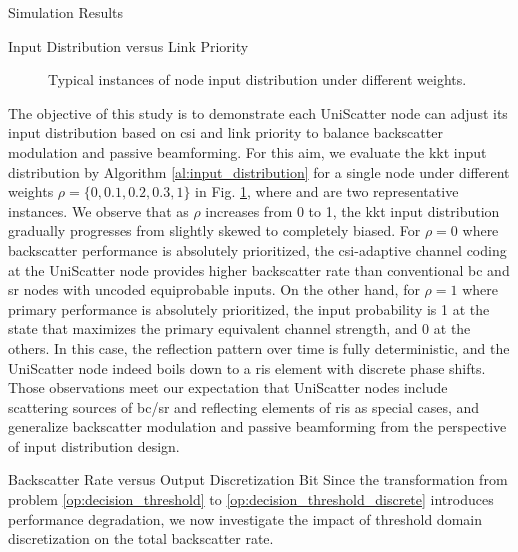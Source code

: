 \documentclass[journal]{IEEEtran}
\begin{document}
\begin{section}{Simulation Results}
	\begin{subsection}{Input Distribution versus Link Priority}
		\begin{figure}[!t]
			\centering
			\caption{Typical instances of node input distribution under different weights.}
			\label{fi:distribution_weights}
		\end{figure}
		The objective of this study is to demonstrate each UniScatter node can adjust its input distribution based on \gls{csi} and link priority to balance backscatter modulation and passive beamforming.
		For this aim, we evaluate the \gls{kkt} input distribution by Algorithm \ref{al:input_distribution} for a single node under different weights $\rho=\{0,0.1,0.2,0.3,1\}$ in Fig. \ref{fi:distribution_weights}, where  and  are two representative instances.
		We observe that as $\rho$ increases from \num{0} to \num{1}, the \gls{kkt} input distribution
		gradually progresses from slightly skewed to completely biased.
		For $\rho=0$ where backscatter performance is absolutely prioritized, the \gls{csi}-adaptive channel coding at the UniScatter node provides higher backscatter rate than conventional \gls{bc} and \gls{sr} nodes with uncoded equiprobable inputs.
		On the other hand, for $\rho=1$ where primary performance is absolutely prioritized, the input probability is \num{1} at the state that maximizes the primary equivalent channel strength, and \num{0} at the others.
		In this case, the reflection pattern over time is fully deterministic, and the UniScatter node indeed boils down to a \gls{ris} element with discrete phase shifts.
		Those observations meet our expectation that UniScatter nodes include scattering sources of \gls{bc}/\gls{sr} and reflecting elements of \gls{ris} as special cases, and generalize backscatter modulation and passive beamforming from the perspective of input distribution design.
	\end{subsection}

	\begin{subsection}{Backscatter Rate versus Output Discretization Bit}
		Since the transformation from problem \eqref{op:decision_threshold} to \eqref{op:decision_threshold_discrete} introduces performance degradation, we now investigate the impact of threshold domain discretization on the total backscatter rate.


\end{subsection}
\end{section}
\end{document}
